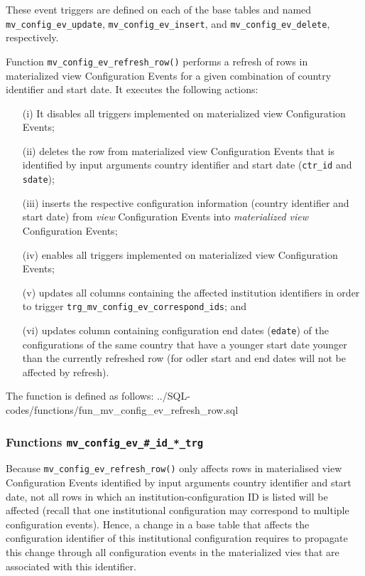 These event triggers are defined on each of the base tables and named \texttt{mv\_config\_ev\_update}, \texttt{mv\_config\_ev\_insert}, and \texttt{mv\_config\_ev\_delete}, respectively. 

Function \texttt{mv\_config\_ev\_refresh\_row()} performs a refresh of rows in materialized view Configuration Events for a given combination of country identifier and start date.
It executes the following actions:
\begin{itemize}
\item[(i)]{It disables all triggers implemented on materialized view Configuration Events;}
\item[(ii)]{deletes the row from materialized view Configuration Events that is identified by input arguments country identifier and start date (\texttt{ctr\_id} and \texttt{sdate});}
\item[(iii)]{inserts the respective configuration information (country identifier and start date) from {\em view} Configuration Events into {\em materialized view} Configuration Events;}
\item[(iv)]{enables all triggers implemented on materialized view Configuration Events;}
\item[(v)]{updates all columns containing the affected institution identifiers in order to trigger \texttt{trg\_mv\_config\_ev\_correspond\_ids}; and}
\item[(vi)]{updates column containing configuration end dates (\texttt{edate}) of the configurations of the same country that have a younger start date younger than the currently refreshed row (for odler start and end dates will not be affected by refresh).}
\end{itemize}

The function is defined as follows:
%
{../SQL-codes/functions/fun_mv_config_ev_refresh_row.sql}

\subsubsection{Functions \texttt{mv\_config\_ev\_\#\_id\_*\_trg}}

Because \texttt{mv\_config\_ev\_refresh\_row()} only affects rows in materialised view Configuration Events identified by input arguments country identifier and start date, not all rows in which an institution-configuration ID is listed will be affected (recall that one institutional configuration may correspond to multiple configuration events).
Hence, a change in a base table that affects the configuration identifier of this institutional configuration requires to propagate this change through all configuration events in the materialized vies that are associated with this identifier. 

